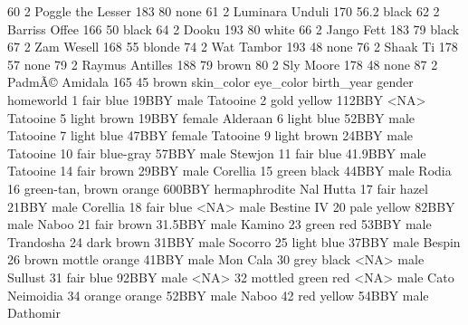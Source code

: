 \documentclass [a4paper] {article}
\begin{document}
\begin{Schunk}
\begin{Soutput}
60                   2     Poggle the Lesser    183    80          none
61                   2       Luminara Unduli    170  56.2         black
62                   2         Barriss Offee    166    50         black
64                   2                 Dooku    193    80         white
66                   2            Jango Fett    183    79         black
67                   2            Zam Wesell    168    55        blonde
74                   2            Wat Tambor    193    48          none
76                   2              Shaak Ti    178    57          none
79                   2       Raymus Antilles    188    79         brown
80                   2             Sly Moore    178    48          none
87                   2        PadmÃ© Amidala    165    45         brown
            skin_color eye_color birth_year        gender      homeworld
1                 fair      blue      19BBY          male       Tatooine
2                 gold    yellow     112BBY          <NA>       Tatooine
5                light     brown      19BBY        female       Alderaan
6                light      blue      52BBY          male       Tatooine
7                light      blue      47BBY        female       Tatooine
9                light     brown      24BBY          male       Tatooine
10                fair blue-gray      57BBY          male        Stewjon
11                fair      blue    41.9BBY          male       Tatooine
14                fair     brown      29BBY          male       Corellia
15               green     black      44BBY          male          Rodia
16    green-tan, brown    orange     600BBY hermaphrodite      Nal Hutta
17                fair     hazel      21BBY          male       Corellia
18                fair      blue       <NA>          male     Bestine IV
20                pale    yellow      82BBY          male          Naboo
21                fair     brown    31.5BBY          male         Kamino
23               green       red      53BBY          male      Trandosha
24                dark     brown      31BBY          male        Socorro
25               light      blue      37BBY          male         Bespin
26        brown mottle    orange      41BBY          male       Mon Cala
30                grey     black       <NA>          male        Sullust
31                fair      blue      92BBY          male           <NA>
32       mottled green       red       <NA>          male Cato Neimoidia
34              orange    orange      52BBY          male          Naboo
42                 red    yellow      54BBY          male       Dathomir

\end{Soutput}
\end{Schunk}
\end{document}

